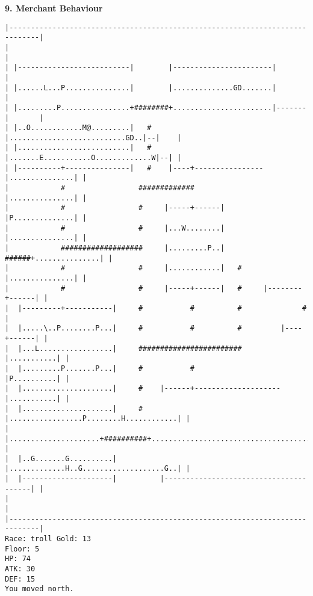 \documentclass[11pt]{article}
\theoremstyle{plain}
\begin{document}
\newpage
\textbf{9. Merchant Behaviour}

\begin{Verbatim}[fontsize=\scriptsize]
|-----------------------------------------------------------------------------|
|                                                                             |
| |--------------------------|        |-----------------------|               |
| |......L...P...............|        |..............GD.......|               |
| |.........P................+########+.......................|-------|       |
| |..O............M@.........|   #    |...........................GD..|--|    |
| |..........................|   #    |.......E...........O.............W|--| |
| |----------+---------------|   #    |----+----------------|...............| |
|            #                 #############                |...............| |
|            #                 #     |-----+------|         |P..............| |
|            #                 #     |...W........|         |...............| |
|            ###################     |.........P..|   ######+...............| |
|            #                 #     |............|   #     |...............| |
|            #                 #     |-----+------|   #     |--------+------| |
|  |---------+-----------|     #           #          #              #        |
|  |.....\..P........P...|     #           #          #         |----+------| |
|  |...L.................|     ########################         |...........| |
|  |.........P.......P...|     #           #                    |P..........| |
|  |.....................|     #    |------+--------------------|...........| |
|  |.....................|     #    |.................P........H............| |
|  |.....................+##########+.......................................| |
|  |..G.......G..........|          |.............H..G...................G..| |
|  |---------------------|          |---------------------------------------| |
|                                                                             |
|-----------------------------------------------------------------------------|
Race: troll Gold: 13                                                   Floor: 5
HP: 74
ATK: 30
DEF: 15
You moved north.
\end{Verbatim}
\end{document}
